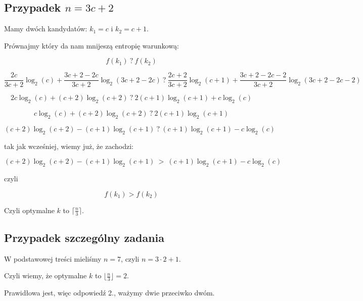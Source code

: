 \documentclass{article}
\begin{document}
\subsection*{Przypadek $n = 3c+2$}
Mamy dwóch kandydatów:
$k_1 = c$ i $k_2 = c+1$.

Prównajmy który da nam mnijeszą entropię warunkową:

$$f(k_1) \: ? \: f(k_2) $$

$$  \frac{2c}{3c+2}\log_2(c) + \frac{3c+2-2c}{3c+2}\log_2(3c+2-2c) \: ? \: 
    \frac{2c + 2}{3c+2}\log_2(c+1) + \frac{3c+2-2c-2}{3c+2}\log_2(3c+2-2c-2) $$

$$ 2c\log_2(c) + (c+2)\log_2(c+2) \: ? \: 2(c+1)\log_2(c+1) + c\log_2(c) $$

$$c\log_2(c) + (c+2)\log_2(c+2) \: ? \: 2(c+1)\log_2(c+1) $$

$$ (c+2)\log_2(c+2) - (c+1)\log_2(c+1) \: ? \: (c+1)\log_2(c+1) - c\log_2(c) $$

tak jak wcześniej, wiemy już, że zachodzi:


$$ (c+2)\log_2(c+2) - (c+1)\log_2(c+1) \: > \: (c+1)\log_2(c+1) - c\log_2(c) $$

czyli

$$ f(k_1) > f(k_2) $$

Czyli optymalne $k$ to $ \lceil \frac{n}{3} \rceil$.

\subsection*{Przypadek szczególny zadania}

W podstawowej treści mieliśmy $n = 7$, czyli $n = 3 \cdot 2 + 1$.

Czyli wiemy, że optymalne $k$ to $\lfloor \frac{n}{3} \rfloor = 2$.

Prawidłowa jest, więc odpowiedź 2., ważymy dwie przeciwko dwóm.
\end{document}
